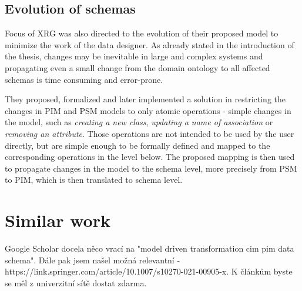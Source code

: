 \subsection{Evolution of schemas}

Focus of XRG was also directed to the evolution \cite{nevcasky2012evolution} of their proposed model to minimize the work of the data designer. As already stated in the introduction of the thesis, changes may be inevitable in large and complex systems and propagating even a small change from the domain ontology to all affected schemas is time consuming and error-prone.

They proposed, formalized and later implemented a solution in restricting the changes in PIM and PSM models to only atomic operations - simple changes in the model, such as \textit{creating a new class}, \textit{updating a name of association} or \textit{removing an attribute}. Those operations are not intended to be used by the user directly, but are simple enough to be formally defined and mapped to the corresponding operations in the level below. The proposed mapping is then used to propagate changes in the model to the schema level, more precisely from PSM to PIM, which is then translated to schema level.

\section{Similar work}

Google Scholar docela něco vrací na "model driven transformation cim pim data schema". Dále pak jsem našel možná relevantní - https://link.springer.com/article/10.1007/s10270-021-00905-x. K článkům byste se měl z univerzitní sítě dostat zdarma.